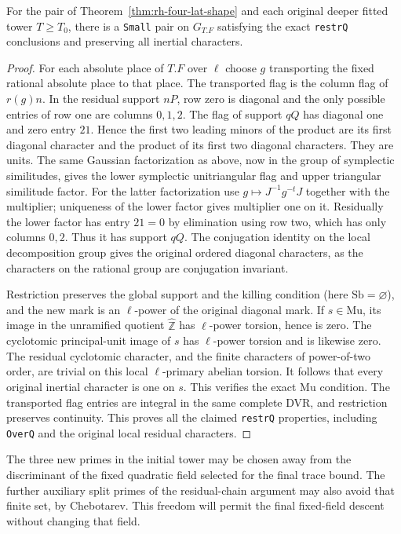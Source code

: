 \begin{lemma}
\label{lem:rh-four-restr-q}
For the pair of Theorem~\ref{thm:rh-four-lat-shape} and
each original deeper fitted tower $T\ge T_0$, there is
a \texttt{Small} pair on $G_{T.F}$ satisfying the exact
\texttt{restrQ} conclusions and preserving all inertial
characters.
\end{lemma}
\begin{proof}
For each absolute place of $T.F$ over $\ell$ choose
$g$ transporting the fixed rational absolute place
to that place. The transported flag is the column flag
of $r(g)n$. In the residual support $nP$, row zero is
diagonal and the only possible entries of row one are
columns $0,1,2$. The flag of support $qQ$ has diagonal
one and zero entry $21$. Hence the first two leading
minors of the product are its first diagonal character
and the product of its first two diagonal characters.
They are units. The same Gaussian factorization as above,
now in the group of symplectic similitudes, gives the
lower symplectic unitriangular flag and upper triangular
similitude factor. For the latter factorization use
$g\mapsto J^{-1}g^{-t}J$ together with the multiplier;
uniqueness of the lower factor gives multiplier one
on it. Residually the lower factor has entry $21=0$
by elimination using row two, which has only columns
$0,2$. Thus it has support $qQ$. The conjugation identity
on the local decomposition group gives the original
ordered diagonal characters, as the characters on the
rational group are conjugation invariant.

Restriction preserves the global support and the killing
condition (here $\mathrm{Sb}=\varnothing$), and the new
mark is an $\ell$-power of the original diagonal mark.
If $s\in\mathrm{Mu}$, its image in the unramified quotient
$\widehat{\mathbb Z}$ has $\ell$-power torsion, hence is
zero. The cyclotomic principal-unit image of $s$ has
$\ell$-power torsion and is likewise zero. The residual
cyclotomic character, and the finite characters of
power-of-two order, are trivial on this local $\ell$-primary
abelian torsion. It follows that every original inertial
character is one on $s$. This verifies the exact
$\mathrm{Mu}$ condition. The transported flag entries
are integral in the same complete DVR, and restriction
preserves continuity. This proves all the claimed
\texttt{restrQ} properties, including \texttt{OverQ}
and the original local residual characters.
\end{proof}

The three new primes in the initial tower may be chosen
away from the discriminant of the fixed quadratic field
selected for the final trace bound. The further auxiliary
split primes of the residual-chain argument may also avoid
that finite set, by Chebotarev. This freedom will permit
the final fixed-field descent without changing that field.

